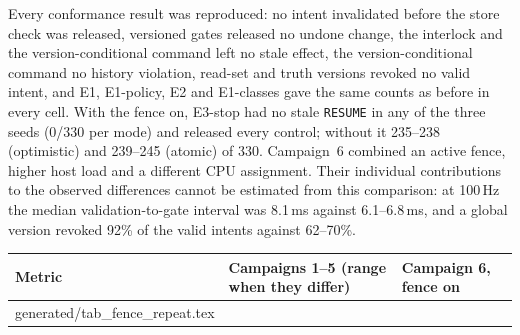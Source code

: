 \documentclass[11pt]{article}
\makeatletter
\newcommand{\gen}[1]{\@@input generated/#1.tex }
\makeatother
\begin{document}
Every conformance result was reproduced: no intent invalidated before the store check was released, versioned gates released no undone change, the interlock and the version-conditional command left no stale effect, the version-conditional command no history violation, read-set and truth versions revoked no valid intent, and E1, E1-policy, E2 and E1-classes gave the same counts as before in every cell. With the fence on, E3-stop had no stale \texttt{RESUME} in any of the three seeds (0/330 per mode) and released every control; without it 235--238 (optimistic) and 239--245 (atomic) of 330. Campaign~6 combined an active fence, higher host load and a different CPU assignment. Their individual contributions to the observed differences cannot be estimated from this comparison: at 100\,Hz the median validation-to-gate interval was 8.1\,ms against 6.1--6.8\,ms, and a global version revoked 92\% of the valid intents against 62--70\%.
\begin{center}\footnotesize
\begin{tabular}{@{}p{7.2cm}p{4.2cm}p{3.0cm}@{}}
\toprule
\textbf{Metric} & \textbf{Campaigns 1--5 (range when they differ)} & \textbf{Campaign 6, fence on} \\
\midrule
\gen{tab_fence_repeat}
\bottomrule
\end{tabular}
\end{center}
\end{document}
